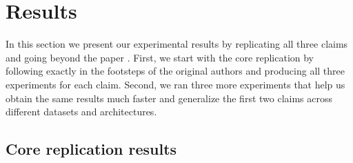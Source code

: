 \section{Results}
\label{sec:Results}
In this section we present our experimental results by replicating all three claims and going beyond the paper \cite{summers2021nondeterminism}. First, we start with the core replication by following exactly in the footsteps of the original authors and producing all three experiments for each claim. Second, we ran three more experiments that help us obtain the same results much faster and generalize the first two claims across different datasets and architectures.


\subsection{Core replication results}

